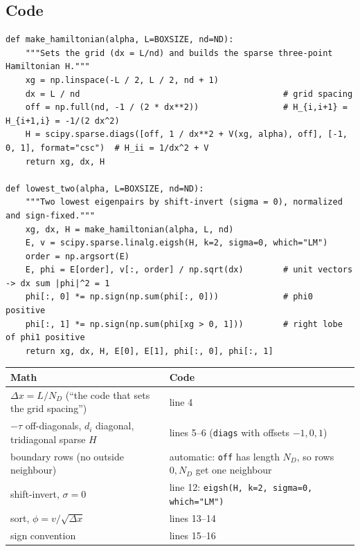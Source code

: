 \documentclass[10pt]{article}
\newcommand{\code}[1]{\texttt{#1}}
\begin{document}
\subsection{Code}
\begin{lstlisting}[firstnumber=1]
def make_hamiltonian(alpha, L=BOXSIZE, nd=ND):
    """Sets the grid (dx = L/nd) and builds the sparse three-point Hamiltonian H."""
    xg = np.linspace(-L / 2, L / 2, nd + 1)
    dx = L / nd                                         # grid spacing
    off = np.full(nd, -1 / (2 * dx**2))                 # H_{i,i+1} = H_{i+1,i} = -1/(2 dx^2)
    H = scipy.sparse.diags([off, 1 / dx**2 + V(xg, alpha), off], [-1, 0, 1], format="csc")  # H_ii = 1/dx^2 + V
    return xg, dx, H

def lowest_two(alpha, L=BOXSIZE, nd=ND):
    """Two lowest eigenpairs by shift-invert (sigma = 0), normalized and sign-fixed."""
    xg, dx, H = make_hamiltonian(alpha, L, nd)
    E, v = scipy.sparse.linalg.eigsh(H, k=2, sigma=0, which="LM")
    order = np.argsort(E)
    E, phi = E[order], v[:, order] / np.sqrt(dx)        # unit vectors -> dx sum |phi|^2 = 1
    phi[:, 0] *= np.sign(np.sum(phi[:, 0]))             # phi0 positive
    phi[:, 1] *= np.sign(np.sum(phi[xg > 0, 1]))        # right lobe of phi1 positive
    return xg, dx, H, E[0], E[1], phi[:, 0], phi[:, 1]
\end{lstlisting}
\begin{center}\small
\begin{tabular}{@{}ll@{}}
\toprule
\textbf{Math} & \textbf{Code}\\
\midrule
$\Delta x=L/N_D$ (``the code that sets the grid spacing'') & line 4\\
$-\tau$ off-diagonals, $d_i$ diagonal, tridiagonal sparse $H$ & lines 5--6 (\code{diags} with offsets $-1,0,1$)\\
boundary rows (no outside neighbour) & automatic: \code{off} has length $N_D$, so rows $0,N_D$ get one neighbour\\
shift-invert, $\sigma=0$ & line 12: \code{eigsh(H, k=2, sigma=0, which="LM")}\\
sort, $\phi=v/\sqrt{\Delta x}$ & lines 13--14\\
sign convention & lines 15--16\\
\bottomrule
\end{tabular}
\end{center}
\end{document}
